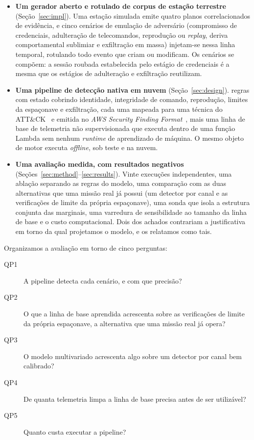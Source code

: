 \documentclass[conference]{IEEEtran}
\begin{document}
\begin{itemize}
  \item \textbf{Um gerador aberto e rotulado de corpus de estação terrestre}
  (Seção~\ref{sec:impl}). Uma estação simulada emite quatro planos
  correlacionados de evidência, e cinco cenários de emulação de adversário
  (compromisso de credenciais, adulteração de telecomandos, reprodução ou
  \emph{replay}, deriva comportamental sublimiar e exfiltração em massa)
  injetam-se nessa linha temporal, rotulando todo evento que criam ou modificam.
  Os cenários se compõem: a sessão roubada estabelecida pelo estágio de
  credenciais é a mesma que os estágios de adulteração e exfiltração reutilizam.

  \item \textbf{Uma pipeline de detecção nativa em nuvem}
  (Seção~\ref{sec:design}). \expRuleCount{} regras com estado cobrindo
  identidade, integridade de comando, reprodução, limites da espaçonave e
  exfiltração, cada uma mapeada para uma técnica do ATT\&CK~\cite{attack} e
  emitida no \emph{AWS Security Finding Format}~\cite{asff}, mais uma linha de
  base de telemetria não supervisionada que executa dentro de uma função Lambda
  sem nenhum \emph{runtime} de aprendizado de máquina. O mesmo objeto de motor
  executa \emph{offline}, sob teste e na nuvem.

  \item \textbf{Uma avaliação medida, com resultados negativos}
  (Seções~\ref{sec:method}--\ref{sec:results}). Vinte execuções independentes,
  uma ablação separando as regras do modelo, uma comparação com as duas
  alternativas que uma missão real já possui (um detector por canal e as
  verificações de limite da própria espaçonave), uma sonda que isola a estrutura
  conjunta das marginais, uma varredura de sensibilidade ao tamanho da linha de
  base e o custo computacional. Dois dos achados contrariam a justificativa em
  torno da qual projetamos o modelo, e os relatamos como tais.
\end{itemize}

Organizamos a avaliação em torno de cinco perguntas:

\begin{description}
  \item[QP1] A pipeline detecta cada cenário, e com que precisão?
  \item[QP2] O que a linha de base aprendida acrescenta sobre as verificações de
  limite da própria espaçonave, a alternativa que uma missão real já opera?
  \item[QP3] O modelo multivariado acrescenta algo sobre um detector por canal
  bem calibrado?
  \item[QP4] De quanta telemetria limpa a linha de base precisa antes de ser
  utilizável?
  \item[QP5] Quanto custa executar a pipeline?
\end{description}
\end{document}

